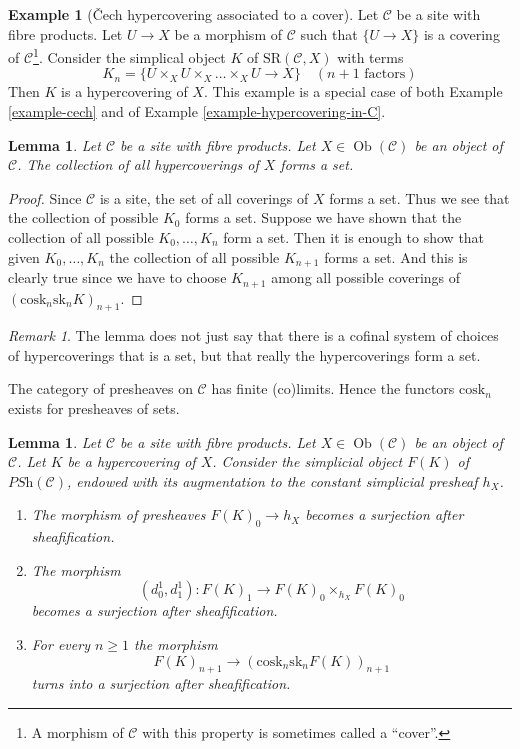 \documentclass{stacks-project}
\theoremstyle{plain}
\newtheorem{lemma}[subsection]{Lemma}
\theoremstyle{definition}
\newtheorem{example}[subsection]{Example}
\theoremstyle{remark}
\newtheorem{remark}[subsection]{Remark}
\numberwithin{equation}{subsection}
\def\Ob{\mathop{\mathrm{Ob}}\nolimits}
\begin{document}
\begin{example}[{\v C}ech hypercovering associated to a cover]
\label{example-cech-cover}
Let $\mathcal{C}$ be a site with fibre products. Let $U \to X$ be a
morphism of $\mathcal{C}$ such that $\{U \to X\}$ is a covering of
$\mathcal{C}$\footnote{A morphism of $\mathcal{C}$ with this property
is sometimes called a ``cover''.}. Consider the simplical object $K$ of
$\text{SR}(\mathcal{C}, X)$ with terms
$$
K_n = \{U \times_X U \times_X \ldots \times_X U \to X\}
\quad (n + 1 \text{ factors})
$$
Then $K$ is a hypercovering of $X$. This example is a special case of both
Example \ref{example-cech} and of
Example \ref{example-hypercovering-in-C}.
\end{example}

\begin{lemma}
\label{lemma-hypercoverings-set}
Let $\mathcal{C}$ be a site with fibre products.
Let $X \in \Ob(\mathcal{C})$ be an object of $\mathcal{C}$.
The collection of all hypercoverings of $X$ forms a set.
\end{lemma}

\begin{proof}
Since $\mathcal{C}$ is a site, the set of all coverings of
$X$ forms a set. Thus we see that the collection
of possible $K_0$ forms a set. Suppose we have shown that
the collection of all possible $K_0, \ldots, K_n$ form
a set. Then it is enough to show that given
$K_0, \ldots, K_n$ the collection of all possible
$K_{n + 1}$ forms a set. And this is clearly true since
we have to choose $K_{n + 1}$ among all possible coverings
of $(\text{cosk}_n \text{sk}_n K)_{n + 1}$.
\end{proof}

\begin{remark}
\label{remark-hypercoverings-really-set}
The lemma does not just say that there is a cofinal
system of choices of hypercoverings that is a set,
but that really the hypercoverings form a set.
\end{remark}

\noindent
The category of presheaves on $\mathcal{C}$ has
finite (co)limits. Hence the functors $\text{cosk}_n$
exists for presheaves of sets.

\begin{lemma}
\label{lemma-hypercovering-F}
Let $\mathcal{C}$ be a site with fibre products.
Let $X \in \Ob(\mathcal{C})$ be an object of $\mathcal{C}$.
Let $K$ be a hypercovering of $X$.
Consider the simplicial object $F(K)$ of $\textit{PSh}(\mathcal{C})$,
endowed with its augmentation to the constant simplicial presheaf $h_X$.
\begin{enumerate}
\item The morphism of presheaves $F(K)_0 \to h_X$ becomes
a surjection after sheafification.
\item The morphism
$$
(d^1_0, d^1_1) :
F(K)_1
\longrightarrow
F(K)_0 \times_{h_X} F(K)_0
$$
becomes a surjection after sheafification.
\item For every $n \geq 1$ the morphism
$$
F(K)_{n + 1} \longrightarrow (\text{cosk}_n \text{sk}_n F(K))_{n + 1}
$$
turns into a surjection after sheafification.
\end{enumerate}
\end{lemma}
\end{document}
